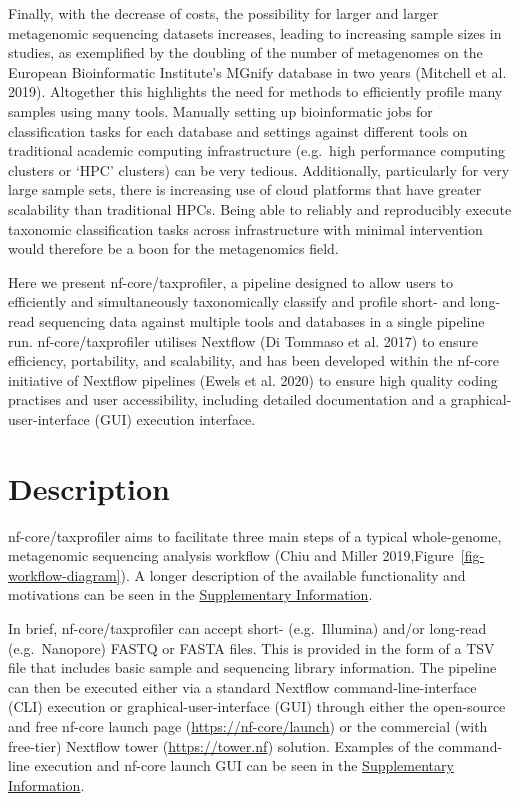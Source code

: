 \documentclass[
]{article}
\begin{document}
Finally, with the decrease of costs, the possibility for larger and
larger metagenomic sequencing datasets increases, leading to increasing
sample sizes in studies, as exemplified by the doubling of the number of
metagenomes on the European Bioinformatic Institute's MGnify database in
two years (Mitchell et al. 2019). Altogether this highlights the need
for methods to efficiently profile many samples using many tools.
Manually setting up bioinformatic jobs for classification tasks for each
database and settings against different tools on traditional academic
computing infrastructure (e.g.~high performance computing clusters or
`HPC' clusters) can be very tedious. Additionally, particularly for very
large sample sets, there is increasing use of cloud platforms that have
greater scalability than traditional HPCs. Being able to reliably and
reproducibly execute taxonomic classification tasks across
infrastructure with minimal intervention would therefore be a boon for
the metagenomics field.

Here we present nf-core/taxprofiler, a pipeline designed to allow users
to efficiently and simultaneously taxonomically classify and profile
short- and long-read sequencing data against multiple tools and
databases in a single pipeline run. nf-core/taxprofiler utilises
Nextflow (Di Tommaso et al. 2017) to ensure efficiency, portability, and
scalability, and has been developed within the nf-core initiative of
Nextflow pipelines (Ewels et al. 2020) to ensure high quality coding
practises and user accessibility, including detailed documentation and a
graphical-user-interface (GUI) execution interface.

\hypertarget{description}{%
\section{Description}\label{description}}

nf-core/taxprofiler aims to facilitate three main steps of a typical
whole-genome, metagenomic sequencing analysis workflow (Chiu and Miller
2019,Figure~\ref{fig-workflow-diagram}). A longer description of the
available functionality and motivations can be seen in the
\protect\hyperlink{supplementary-information}{Supplementary
Information}.

In brief, nf-core/taxprofiler can accept short- (e.g.~Illumina) and/or
long-read (e.g.~Nanopore) FASTQ or FASTA files. This is provided in the
form of a TSV file that includes basic sample and sequencing library
information. The pipeline can then be executed either via a standard
Nextflow command-line-interface (CLI) execution or
graphical-user-interface (GUI) through either the open-source and free
nf-core launch page (\url{https://nf-core/launch}) or the commercial
(with free-tier) Nextflow tower (\url{https://tower.nf}) solution.
Examples of the command-line execution and nf-core launch GUI can be
seen in the \protect\hyperlink{supplementary-information}{Supplementary
Information}.
\end{document}
